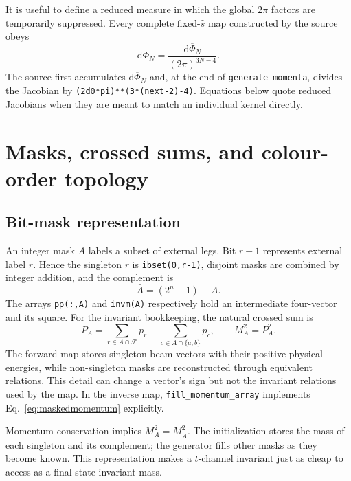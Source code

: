 \documentclass[11pt,a4paper]{article}
\newcommand{\shat}{\hat{s}}
\newcommand{\dd}{\mathrm{d}}
\newcommand{\code}[1]{\texttt{#1}}
\newcommand{\mc}[1]{\mathcal{#1}}
\begin{document}
It is useful to define a reduced measure in which the global $2\pi$ factors
are temporarily suppressed.  Every complete fixed-$\shat$ map constructed by
the source obeys
\begin{equation}
 \dd\Phi_N=\frac{\dd\overline\Phi_N}{(2\pi)^{3N-4}}.
 \label{eq:reducedmeasure}
\end{equation}
The source first accumulates $\dd\overline\Phi_N$ and, at the end of
\code{generate\_momenta}, divides the Jacobian by
\code{(2d0*pi)**(3*(next-2)-4)}.  Equations below quote reduced Jacobians when
they are meant to match an individual kernel directly.

\section{Masks, crossed sums, and colour-order topology}

\subsection{Bit-mask representation}

An integer mask $A$ labels a subset of external legs.  Bit $r-1$ represents
external label $r$.  Hence the singleton $r$ is \code{ibset(0,r-1)}, disjoint
masks are combined by integer addition, and the complement is
\begin{equation}
 \bar A=(2^n-1)-A .
\end{equation}
The arrays \code{pp(:,A)} and \code{invm(A)} respectively hold an intermediate
four-vector and its square.  For the invariant bookkeeping, the natural
crossed sum is
\begin{equation}
 P_A=\sum_{r\in A\cap\mc F}p_r-
     \sum_{c\in A\cap\{a,b\}}p_c,
 \qquad M_A^2=P_A^2 .
 \label{eq:maskedmomentum}
\end{equation}
The forward map stores singleton beam vectors with their positive physical
energies, while non-singleton masks are reconstructed through equivalent
relations.  This detail can change a vector's sign but not the invariant
relations used by the map.  In the inverse map, \code{fill\_momentum\_array}
implements Eq.~\eqref{eq:maskedmomentum} explicitly.

Momentum conservation implies $M_A^2=M_{\bar A}^2$.  The initialization stores
the mass of each singleton and its complement; the generator fills other masks
as they become known.  This representation makes a $t$-channel invariant just
as cheap to access as a final-state invariant mass.
\end{document}
